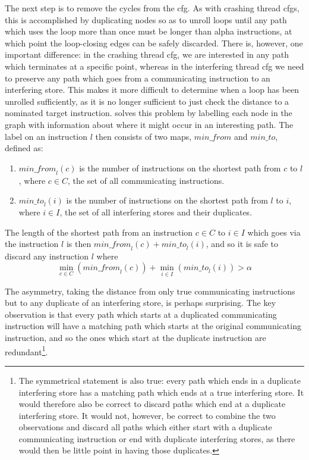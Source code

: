 The next step is to remove the cycles from the \gls{cfg}.  As with crashing
thread \glspl{cfg}, this is accomplished by duplicating nodes so as to unroll
loops until any path which uses the loop more than once must be longer
than \gls{alpha} instructions, at which point the loop-closing
edges can be safely discarded.  There is, however, one important
difference: in the crashing thread \gls{cfg}, we are interested in any path
which terminates at a specific point, whereas in the interfering
thread \gls{cfg} we need to preserve any path which goes from a
communicating instruction to an interfering store.  This makes it more
difficult to determine when a loop has been unrolled sufficiently, as
it is no longer sufficient to just check the distance to a nominated
target instruction.  {\Technique} solves this problem by labelling
each node in the graph with information about where it might occur in
an interesting path.  The label on an instruction $l$ then consists of
two maps, $\mathit{min\_from}$ and $\mathit{min\_to}$, defined as:

\begin{enumerate}
\item
  $\mathit{min\_from}_l(c)$ is the number of instructions on the
  shortest path from $c$ to $l$, where $c \in C$, the set of all
  communicating instructions.
\item
  $\mathit{min\_to}_l(i)$ is the number of instructions on the
  shortest path from $l$ to $i$, where $i \in I$, the set of all
  interfering stores and their duplicates.
\end{enumerate}

The length of the shortest path from an instruction $c \in C$ to $i
\in I$ which goes via the instruction $l$ is then
$\mathit{min\_from}_l(c) + \mathit{min\_to}_l(i)$, and so it is safe
to discard any instruction $l$ where
\begin{displaymath}
\min_{c \in C}\left(\mathit{min\_from}_l(c)\right) + \min_{i \in I}\left(\mathit{min\_to}_l(i)\right) > \alpha
\end{displaymath}

The asymmetry, taking the distance from only true communicating
instructions but to any duplicate of an interfering store, is perhaps
surprising.  The key observation is that every path which starts at a
duplicated communicating instruction will have a matching path which
starts at the original communicating instruction, and so the ones
which start at the duplicate instruction are redundant\footnote{The
  symmetrical statement is also true: every path which ends in a
  duplicate interfering store has a matching path which ends at a true
  interfering store.  It would therefore also be correct to discard
  paths which end at a duplicate interfering store.  It would not,
  however, be correct to combine the two observations and discard all
  paths which either start with a duplicate communicating instruction
  or end with duplicate interfering stores, as there would then be
  little point in having those duplicates.}.


